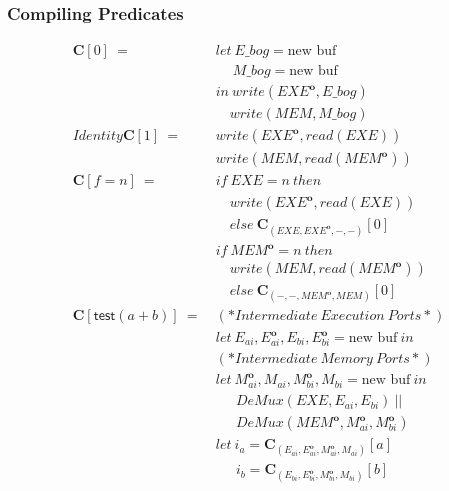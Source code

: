 \documentclass[12pt, letterpaper]{article}
\newcommand\obf[1]{#1^\mathbf{o}}
\begin{document}
      \subsubsection{Compiling Predicates}\label{sec:compile:compile:pred}
        \begin{figure}
          \begin{align*}
            \mathbf{C}[0]\ 
              =\ &
              let\ E\_bog = \text{new buf}\\
              &\quad\ M\_bog = \text{new buf}\\
              &in\ write(\obf{EXE}, E\_bog)\\
              &\quad  write(MEM, M\_bog)\\
            Identity
            \mathbf{C}[1]\ 
              =\ &
              write(\obf{EXE}, read(EXE))\\
              &write(MEM, read(\obf{MEM}))
              \\
            \mathbf{C}[f = n]\
              =\
              &if\ EXE=n\ then\\
              &\quad write(\obf{EXE}, read(EXE))\\
              &\quad else\ \mathbf{C}_{(EXE, \obf{EXE}, -, -)}[0]\\
              &if\ \obf{MEM}=n\ then\\
              &\quad write(MEM, read(\obf{MEM}))\\
              &\quad else\ \mathbf{C}_{(-, -, \obf{MEM}, MEM)}[0]\\
            \mathbf{C}[\mathsf{test}(a + b)]\ 
              =\
              & (*Intermediate\ Execution\ Ports*)\\
              & let\ E_{ai}, \obf{E}_{ai}, E_{bi}, \obf{E}_{bi} = \text{new buf}\ in\\
              & (*Intermediate\ Memory\ Ports*)\\
              & let\ \obf{M}_{ai}, M_{ai}, \obf{M}_{bi}, M_{bi} = \text{new buf}\ in\\
              &\quad\ \ DeMux(EXE, E_{ai}, E_{bi})\ ||\\
              &\quad\ \ DeMux(\obf{MEM}, \obf{M}_{ai}, \obf{M}_{bi})\\
              &let\     i_a = \mathbf{C}_{(E_{ai},\obf{E}_{ai},\obf{M}_{ai},M_{ai})}[a]\\
              &\quad\ \ i_b = \mathbf{C}_{(E_{bi},\obf{E}_{bi},\obf{M}_{bi},M_{bi})}[b]\\

\end{align*}
\end{figure}
\end{document}
